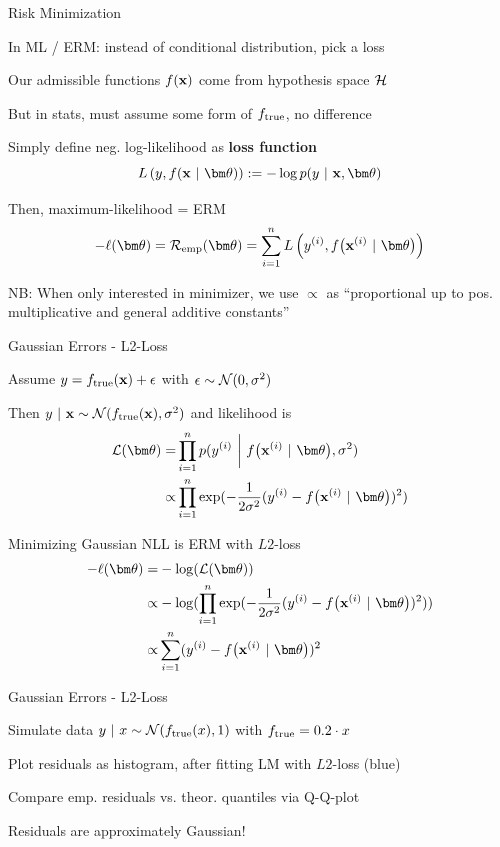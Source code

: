\documentclass[11pt,compress,t,notes=noshow, xcolor=table]{beamer}
\begin{document}
\begin{framei}[sep=M]{Risk Minimization} 

\item In ML / ERM: instead of conditional distribution, pick a loss 
\item Our admissible functions $f(\mathbf{x})$ come from hypothesis space $\mathcal{H}$
\item But in stats, must assume some form of $f_{\text{true}}$, no difference
\item Simply define neg. log-likelihood as \textbf{loss function} 
$$ \Lxyt := - \lpdfygxt $$
\item Then, maximum-likelihood 
 = ERM
$$- \loglt = \risket = \sumin \Lxyit$$
\item NB: When only interested in minimizer, we use $\propto$ as \enquote{proportional up to pos. multiplicative and general additive constants}

\end{framei}


\begin{framei}[sep=M]{Gaussian Errors - L2-Loss} 

\item Assume $y = f_{\text{true}}(\mathbf{x}) + \epsilon$ with $\epsilon \sim \mathcal{N}(0, \sigma^2)$ 
\item Then $y~|~\mathbf{x} \sim \mathcal{N}(f_{\text{true}}(\mathbf{x}), \sigma^2)$ and likelihood is 
{\small
\begin{align*}
\LL(\thetav) =& \prodin \pdf(\yi ~\bigg|~ \fxit, \sigma^2) \\ 
\propto& \prodin \exp(-\frac{1}{2\sigma^2} (\yi - \fxit)^2)
\end{align*}
}
\item Minimizing Gaussian NLL is ERM with $L2$-loss
\begin{align*}
- \loglt =& - \log(\LL(\thetav)) \\
\propto& - \log(\prodin \exp(-\frac{1}{2\sigma^2} (\yi - \fxit)^2)) \\
\propto& \sumin (\yi - \fxit)^2
\end{align*}

\end{framei}


\begin{framei}[sep=M]{Gaussian Errors - L2-Loss} 

\item Simulate data $y ~|~x \sim \mathcal{N}(f_{\text{true}}(x), 1)$ with $f_{\text{true}} = 0.2 \cdot x$ 
\item Plot residuals as histogram, after fitting LM with $L2$-loss (blue)
\item Compare emp. residuals vs. theor. quantiles via Q-Q-plot

\vfill


\vfill

\item Residuals are approximately Gaussian!

\end{framei}
\end{document}
